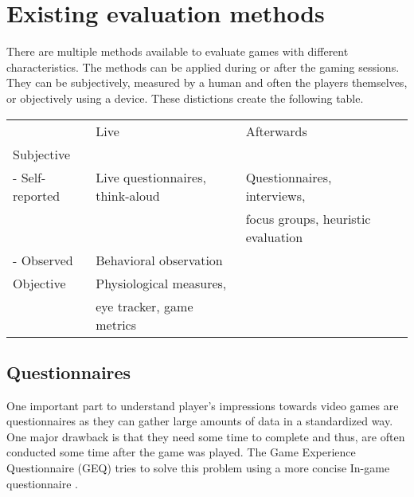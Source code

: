 \chapter{Existing evaluation methods}
\label{ch:evaluationmethods}

There are multiple methods available to evaluate games with different characteristics. The methods can be applied during or after the gaming sessions. They can be subjectively, measured by a human and often the players themselves, or objectively using a device. These distictions create the following table.
 
\begin{table}[]
	\begin{tabular}{llll}
					& Live                                              & Afterwards\\
	Subjective      &                                                   & \\
	- Self-reported & Live questionnaires, think-aloud                  & Questionnaires, interviews,\\ 
					& 													& focus groups, heuristic evaluation \\
	- Observed      & Behavioral observation 							& \\
	Objective       & Physiological measures, 							& \\  
					& eye tracker, game metrics         				&\\                                                    
	\end{tabular}
\end{table}                                             								


\section{Questionnaires}
One important part to understand player's impressions towards video games are questionnaires as they can gather large amounts of data in a standardized way. One major drawback is that they need some time to complete and thus, are often conducted some time after the game was played. The Game Experience Questionnaire (GEQ) tries to solve this problem using a more concise In-game questionnaire \cite{poels2007game}. 





